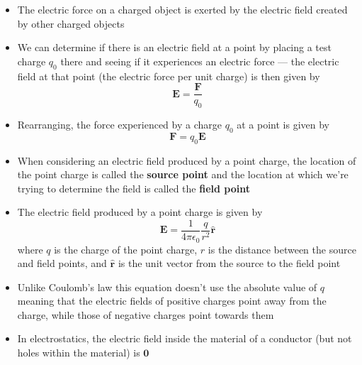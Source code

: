 \documentclass{article}
\begin{document}
\begin{itemize}
  \item The electric force on a charged object is exerted by the electric field created by other charged objects

  \item We can determine if there is an electric field at a point by placing a test charge $q_0$ there and seeing if it experiences an electric force — the electric field at that point (the electric force per unit charge) is then given by \[\mathbf{E} = \frac{\mathbf{F}}{q_0}\]

  \item Rearranging, the force experienced by a charge $q_0$ at a point is given by \[\mathbf{F} = q_0\mathbf{E}\]

  \item When considering an electric field produced by a point charge, the location of the point charge is called the \textbf{source point} and the location at which we're trying to determine the field is called the \textbf{field point}

  \item The electric field produced by a point charge is given by \[\mathbf{E} = \frac{1}{4\pi\epsilon_0} \frac{q}{r^2}\hat{\mathbf{r}}\] where $q$ is the charge of the point charge, $r$ is the distance between the source and field points, and $\hat{\mathbf{r}}$ is the unit vector from the source to the field point

  \item Unlike Coulomb's law this equation doesn't use the absolute value of $q$ meaning that the electric fields of positive charges point away from the charge, while those of negative charges point towards them

  \item In electrostatics, the electric field inside the material of a conductor (but not holes within the material) is $\mathbf{0}$
\end{itemize}
\end{document}
